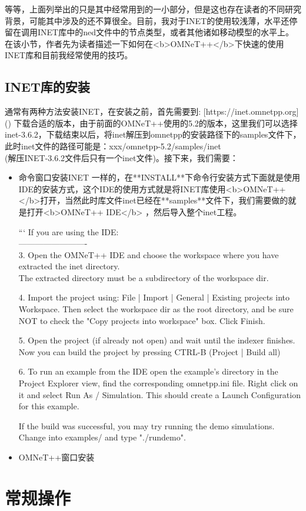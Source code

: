 等等，上面列举出的只是其中经常用到的一小部分，但是这也存在读者的不同研究背景，可能其中涉及的还不算很全。目前，我对于INET的使用较浅薄，水平还停留在调用INET库中的ned文件中的节点类型，或者其他诸如移动模型的水平上。在该小节，作者先为读者描述一下如何在<b>OMNeT++</b>下快速的使用INET库和目前我经常使用的技巧。\\

\subsection{INET库的安装}
通常有两种方法安装INET，在安装之前，首先需要到:
[https://inet.omnetpp.org]()
下载合适的版本，由于前面的OMNeT++使用的5.2的版本，这里我们可以选择inet-3.6.2，下载结束以后，将inet解压到omnetpp的安装路径下的samples文件下，此时inet文件的路径可能是：xxx/omnetpp-5.2/samples/inet\\
(解压INET-3.6.2文件后只有一个inet文件)。接下来，我们需要：

\begin{itemize}
	\item 命令窗口安装INET
	一样的，在**INSTALL**下命令行安装方式下面就是使用IDE的安装方式，这个IDE的使用方式就是将INET库使用<b>OMNeT++</b>打开，当然此时库文件inet已经在**samples**文件下，我们需要做的就是打开<b>OMNeT++ IDE</b> ，然后导入整个inet工程。
		
\begin{definition}
```
If you are using the IDE:\\
-------------------------\\
3. Open the OMNeT++ IDE and choose the workspace where you have extracted the inet directory.\\
The extracted directory must be a subdirectory of the workspace dir.

4. Import the project using: File | Import | General | Existing projects into Workspace.
Then select the workspace dir as the root directory, and be sure NOT to check the
"Copy projects into workspace" box. Click Finish.

5. Open the project (if already not open) and wait until the indexer finishes.
Now you can build the project by pressing CTRL-B (Project | Build all)

6. To run an example from the IDE open the example's directory in the Project Explorer view,
find the corresponding omnetpp.ini file. Right click on it and select Run As / Simulation.
This should create a Launch Configuration for this example.

If the build was successful, you may try running the demo simulations.
Change into examples/ and type "./rundemo".

\end{definition}
		
		
	\item OMNeT++窗口安装	
\end{itemize}


\section{常规操作}






